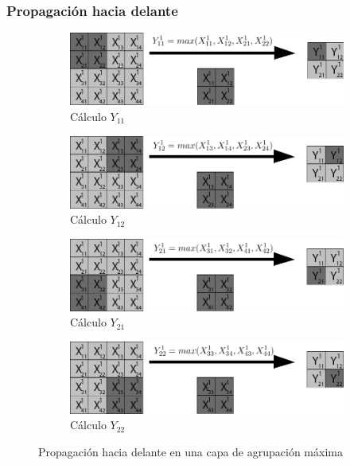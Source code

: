 \subsubsection{Propagación hacia delante}

\begin{figure}[H]
	\centering
	\begin{subfigure}{.5\textwidth}
		\hspace{-10mm}
		\includegraphics[width=1.2\linewidth]{imagenes/maxpool_1.jpg}  
		\caption{Cálculo $Y_{11}$}
	\end{subfigure}%
	\begin{subfigure}{.5\textwidth}
		\hspace{10mm}
		\includegraphics[width=1.2\linewidth]{imagenes/maxpool_2.jpg}  
		\caption{Cálculo $Y_{12}$}
	\end{subfigure}
	
	\vspace{5mm}
	\begin{subfigure}{.5\textwidth}
		\hspace{-10mm}
		\includegraphics[width=1.2\linewidth]{imagenes/maxpool_3.jpg}  
		\caption{Cálculo $Y_{21}$}
	\end{subfigure}%
	\begin{subfigure}{.5\textwidth}
		\hspace{10mm}
		\includegraphics[width=1.2\linewidth]{imagenes/maxpool_4.jpg}  
		\caption{Cálculo $Y_{22}$}
	\end{subfigure}
	\caption{Propagación hacia delante en una capa de agrupación máxima}
	\label{fig:forward_prop_maxpool}
\end{figure}

